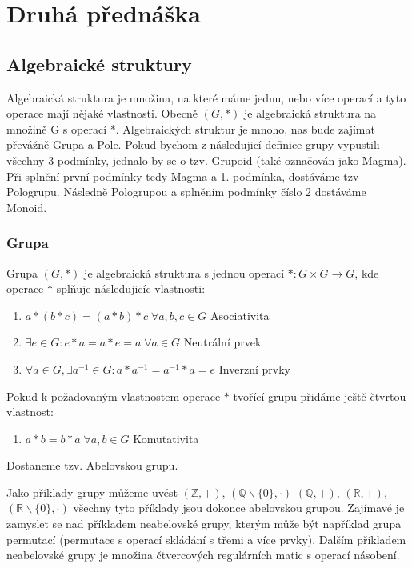 \section{Druhá přednáška}

\subsection{Algebraické struktury}
Algebraická struktura je množina, na které máme jednu, nebo více operací
a tyto operace mají nějaké vlastnosti. Obecně $(G, *)$ je algebraická
struktura na množině G s operací *. Algebraických struktur je mnoho, nas bude
zajímat převážně Grupa a Pole. Pokud bychom z následujicí definice grupy vypustili
všechny 3 podmínky, jednalo by se o tzv. Grupoid (také označován jako Magma). Při splnění první
podmínky tedy Magma a 1. podmínka, dostáváme tzv Pologrupu. Následně Pologrupou a
splněním podmínky číslo 2 dostáváme Monoid.

\subsubsection{Grupa}
\begin{definition}[Grupa]
    Grupa $(G, *)$ je algebraická struktura s jednou operací $*: G \times G \rightarrow G$,
    kde operace $*$ splňuje následujicíc vlastnosti:
    \begin{enumerate}
        \item $a * (b * c) = (a * b) * c \; \forall a, b, c \in G$ \hfill Asociativita
        \item $\exists e \in G: e * a = a * e = a \; \forall a \in G$ \hfill Neutrální prvek
        \item $\forall a \in G, \exists a^{-1} \in G: a * a^{-1} = a^{-1} * a = e$ \hfill
        Inverzní prvky
    \end{enumerate}
\end{definition}

\begin{definition}
    Pokud k požadovaným vlastnostem operace $*$ tvořící grupu přidáme ještě
    čtvrtou vlastnost:
    \begin{enumerate}[start=4]
        \item $a * b = b * a \; \forall a, b \in G$ \hfill Komutativita
    \end{enumerate}
    Dostaneme tzv. Abelovskou grupu.
\end{definition}

Jako příklady grupy můžeme uvést $(\mathbb{Z, +})$, $(\mathbb{Q} \smallsetminus \{0\}, \cdot)$
$(\mathbb{Q}, +)$, $(\mathbb{R}, +)$, $(\mathbb{R} \smallsetminus \{0\}, \cdot)$
všechny tyto příklady jsou dokonce abelovskou grupou. Zajímavé je zamyslet se nad příkladem
neabelovské grupy, kterým může být například grupa permutací (permutace s operací skládání s třemi
a více prvky). Dalším příkladem neabelovské grupy je množina čtvercových regulárních matic s operací
násobení.

